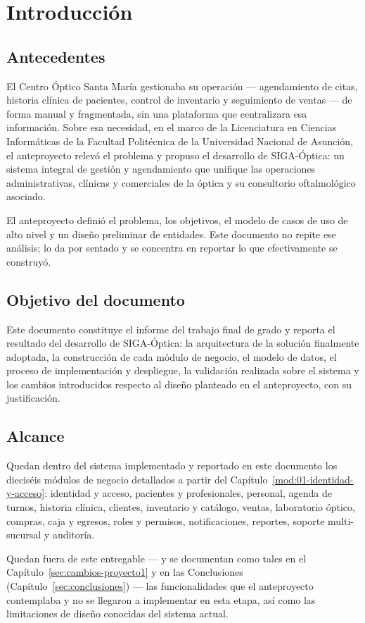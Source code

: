 \chapter{Introducción}
\label{sec:introduccion}

\section{Antecedentes}
\label{sec:intro-antecedentes}

El Centro Óptico Santa María gestionaba su operación --- agendamiento de citas, historia clínica de pacientes, control de inventario y seguimiento de ventas --- de forma manual y fragmentada, sin una plataforma que centralizara esa información. Sobre esa necesidad, en el marco de la Licenciatura en Ciencias Informáticas de la Facultad Politécnica de la Universidad Nacional de Asunción, el anteproyecto relevó el problema y propuso el desarrollo de SIGA-Óptica: un sistema integral de gestión y agendamiento que unifique las operaciones administrativas, clínicas y comerciales de la óptica y su consultorio oftalmológico asociado.

El anteproyecto definió el problema, los objetivos, el modelo de casos de uso de alto nivel y un diseño preliminar de entidades. Este documento no repite ese análisis; lo da por sentado y se concentra en reportar lo que efectivamente se construyó.

\section{Objetivo del documento}
\label{sec:intro-objetivo-documento}

Este documento constituye el informe del trabajo final de grado y reporta el resultado del desarrollo de SIGA-Óptica: la arquitectura de la solución finalmente adoptada, la construcción de cada módulo de negocio, el modelo de datos, el proceso de implementación y despliegue, la validación realizada sobre el sistema y los cambios introducidos respecto al diseño planteado en el anteproyecto, con su justificación.

\section{Alcance}
\label{sec:intro-alcance}

Quedan dentro del sistema implementado y reportado en este documento los dieciséis módulos de negocio detallados a partir del Capítulo~\ref{mod:01-identidad-y-acceso}: identidad y acceso, pacientes y profesionales, personal, agenda de turnos, historia clínica, clientes, inventario y catálogo, ventas, laboratorio óptico, compras, caja y egresos, roles y permisos, notificaciones, reportes, soporte multi-sucursal y auditoría.

Quedan fuera de este entregable --- y se documentan como tales en el Capítulo~\ref{sec:cambios-proyecto1} y en las Conclusiones (Capítulo~\ref{sec:conclusiones}) --- las funcionalidades que el anteproyecto contemplaba y no se llegaron a implementar en esta etapa, así como las limitaciones de diseño conocidas del sistema actual.
